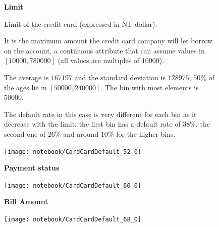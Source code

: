 \documentclass[11pt,a4paper]{report}
\begin{document}
\smallskip

\begin{figure}[h]
  \begin{minipage}[h]{.50\textwidth}
        {\Large \textbf{Limit}}
        
        Limit of the credit card (expressed in NT dollar).
        
        It is the maximum amount the credit card company will let borrow on the account, 
        a continuous attribute that can assume values in $[10000, 780000]$ (all values are multiples of $10000$).
        
        The average is $167197$ and the standard deviation is $128975$, $50\%$ of the ages lie in $[50000, 240000]$. The bin with most elements is $50000$.
        
        The default rate in this case is very different for each bin as it decrease with the limit: the first bin has a default rate of $38\%$, the second one of $26\%$ and around $10\%$ for the higher bins.
        
  \end{minipage}
  \begin{minipage}[h]{.45\textwidth}
    \texttt{[image: notebook/CardCardDefault\_52\_0]}
  \end{minipage}

\end{figure}

\smallskip
\begin{figure}[h]
  \begin{minipage}[h]{.40\textwidth}
        {\Large \textbf{Payment status}}
        

  \end{minipage}
  \begin{minipage}[h]{.60\textwidth}
    \texttt{[image: notebook/CardCardDefault\_60\_0]}
  \end{minipage}
\end{figure}

\smallskip
\begin{figure}[h]
  \begin{minipage}[h]{.40\textwidth}
        {\Large \textbf{Bill Amount}}
        

  \end{minipage}
  \begin{minipage}[h]{.60\textwidth}
    \texttt{[image: notebook/CardCardDefault\_68\_0]}
  \end{minipage}
\end{figure}
\end{document}
